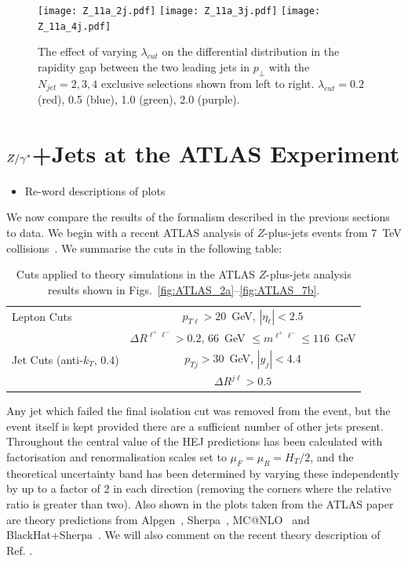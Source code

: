 	\begin{figure}[htp!]
		\centering
		\texttt{[image: Z\_11a\_2j.pdf]}\hfill
		\texttt{[image: Z\_11a\_3j.pdf]}\hfill
		\texttt{[image: Z\_11a\_4j.pdf]}
		\caption{The effect of varying $\lambda_{cut}$ on the differential distribution
		in the rapidity gap between the two leading jets in $p_\perp$ with the $N_{jet}=2,3,4$
		exclusive selections shown from left to right.  $\lambda_{cut}=0.2$ (red), 0.5 (blue), 1.0 (green), 2.0 (purple).}
		\label{fig:lambdadist}
	\end{figure}

\section{$Z/\gamma^*$+Jets at the ATLAS Experiment}

	\begin{itemize}
		\item Re-word descriptions of plots
	\end{itemize}

	We now compare the results of the formalism described in the previous sections
	to data.  We begin with a recent ATLAS analysis of $Z$-plus-jets events from
	7~TeV collisions~\cite{Aad:2013ysa}.  We summarise the cuts in the following
	table:

	\begin{table}[bth]
	  \centering
	  \begin{tabular}{|l|c|}
	    \hline
	    Lepton Cuts & $p_{T\ell}>20$~GeV, \; $|\eta_\ell|<2.5$ \\
	    & $\Delta R^{\ell^+\ell^-} > 0.2$, \; $66$~GeV $\leq m^{\ell^+\ell^-} \leq
	      116$~GeV \\ \hline
	    Jet Cuts (anti-$k_T$, 0.4) & $p_{Tj}>30$~GeV, \; $|y_j|<4.4$ \\
	    & $\Delta R^{j\ell} >0.5$ \\
	\hline
	  \end{tabular}
	  \caption{Cuts applied to theory simulations in the ATLAS
	    $Z$-plus-jets analysis results shown in Figs.~\ref{fig:ATLAS_2a}--\ref{fig:ATLAS_7b}.}
	  \label{tab:atlascuts}
	\end{table}

	Any jet which failed the final isolation cut was removed from the event, but the
	event itself is kept provided there are a sufficient number of other jets
	present.  Throughout the central value of the HEJ predictions has been
	calculated with factorisation and renormalisation scales set to
	$\mu_F=\mu_R=H_T/2$, and the theoretical uncertainty band has been determined by
	varying these independently by up to a factor of 2 in each direction (removing
	the corners where the relative ratio is greater than two).  Also shown in the
	plots taken from the ATLAS paper are theory predictions from
	Alpgen~\cite{Mangano:2002ea}, Sherpa~\cite{Gleisberg:2008ta,Hoeche:2012yf},
	MC@NLO~\cite{Frixione:2002ik} and
	BlackHat+Sherpa~\cite{Berger:2010vm,Ita:2011wn}.  We will also comment on the
	recent theory description of Ref.\cite{Frederix:2015eii} .

